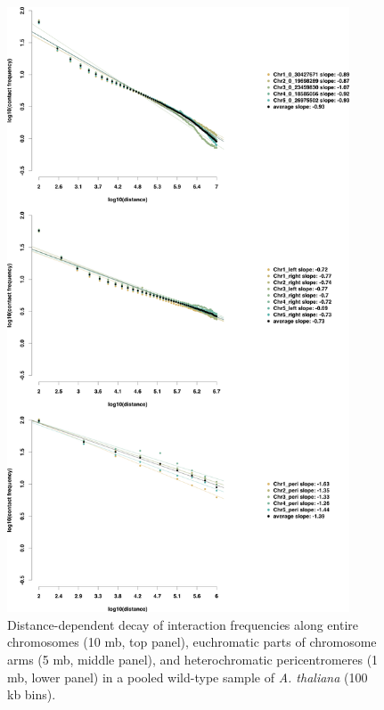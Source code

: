 \documentclass[a4paper,10pt]{article}
\begin{document}
\begin{figure}[!ht]
\begin{center}
\centering
\includegraphics[width=4in]{mergedDD.png}
\end{center}
\caption{Distance-dependent decay of interaction frequencies along entire chromosomes (10 mb, top panel), euchromatic parts of chromosome arms (5 mb, middle panel), and heterochromatic pericentromeres (1 mb, lower panel) in a pooled wild-type sample of \textit{A. thaliana} \cite{2012_Moissiard,2014_Grob} (100 kb bins).}
\label{distanceDecay}
\end{figure}
\clearpage
\end{document}
